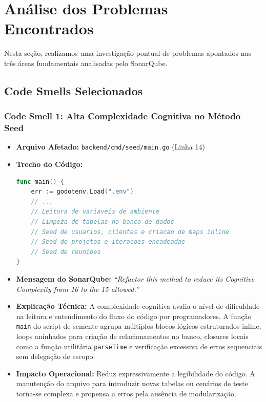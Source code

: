 \documentclass[12pt,a4paper]{article}
\begin{document}
\section{Análise dos Problemas Encontrados}

Nesta seção, realizamos uma investigação pontual de problemas apontados nas três áreas fundamentais analisadas pelo SonarQube.

\subsection{Code Smells Selecionados}

\subsubsection{Code Smell 1: Alta Complexidade Cognitiva no Método Seed}
\begin{itemize}
    \item \textbf{Arquivo Afetado:} \texttt{backend/cmd/seed/main.go} (Linha 14)
    \item \textbf{Trecho do Código:}
\begin{lstlisting}[language=Go]
func main() {
    err := godotenv.Load(".env")
    // ...
    // Leitura de variaveis de ambiente
    // Limpeza de tabelas no banco de dados
    // Seed de usuarios, clientes e criacao de maps inline
    // Seed de projetos e iteracoes encadeadas
    // Seed de reunioes
}
\end{lstlisting}
    \item \textbf{Mensagem do SonarQube:} \textit{``Refactor this method to reduce its Cognitive Complexity from 16 to the 15 allowed.''}
    \item \textbf{Explicação Técnica:} A complexidade cognitiva avalia o nível de dificuldade na leitura e entendimento do fluxo do código por programadores. A função \texttt{main} do script de semente agrupa múltiplos blocos lógicos estruturados inline, loops aninhados para criação de relacionamentos no banco, closures locais como a função utilitária \texttt{parseTime} e verificação excessiva de erros sequenciais sem delegação de escopo.
    \item \textbf{Impacto Operacional:} Reduz expressivamente a legibilidade do código. A manutenção do arquivo para introduzir novas tabelas ou cenários de teste torna-se complexa e propensa a erros pela ausência de modularização.
\end{itemize}
\end{document}
